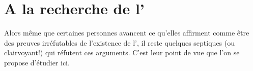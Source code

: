 \section{A la recherche de l'\op}
Alors même que certaines personnes avancent ce qu'elles affirment comme être des preuves irréfutables de l'existence de l'\op, il reste quelques septiques (ou clairvoyant!) qui réfutent ces arguments.
C'est leur point de vue que l'on se propose d'étudier ici.
